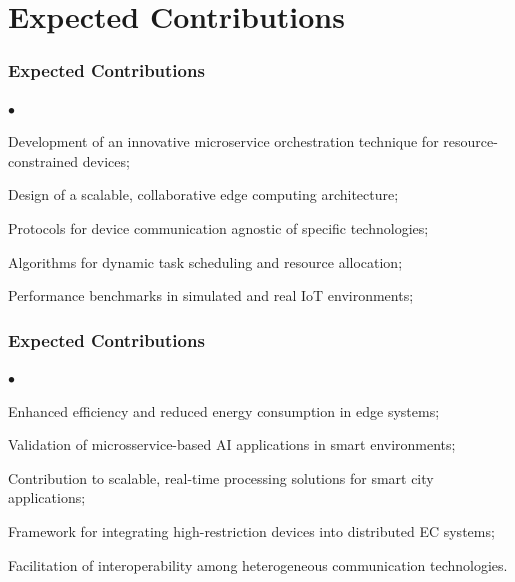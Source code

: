 \documentclass[tikz]{beamer}
\begin{document}
\section{Expected Contributions}
\begin{frame}
\frametitle{Expected Contributions}
\begin{list}{$\bullet$}{}
    \item Development of an innovative microservice orchestration technique for resource-constrained devices;
    \item Design of a scalable, collaborative edge computing architecture;
    \item Protocols for device communication agnostic of specific technologies;
    \item Algorithms for dynamic task scheduling and resource allocation;
    \item Performance benchmarks in simulated and real IoT environments;
\end{list}
\end{frame}

\begin{frame}
\frametitle{Expected Contributions}
\begin{list}{$\bullet$}{}
    \item Enhanced efficiency and reduced energy consumption in edge systems;
    \item Validation of microsservice-based AI applications in smart environments;
    \item Contribution to scalable, real-time processing solutions for smart city applications;
    \item Framework for integrating high-restriction devices into distributed EC systems;
    \item Facilitation of interoperability among heterogeneous communication technologies.
\end{list}
\end{frame}
\end{document}
